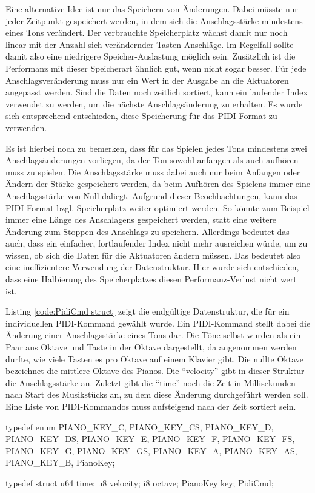 Eine alternative Idee ist nur das Speichern von Änderungen.
Dabei müsste nur jeder Zeitpunkt gespeichert werden, in dem sich die Anschlagsstärke mindestens eines Tons verändert.
Der verbrauchte Speicherplatz wächst damit nur noch linear mit der Anzahl sich verändernder Tasten-Anschläge.
Im Regelfall sollte damit also eine niedrigere Speicher-Auslastung möglich sein.
Zusätzlich ist die Performanz mit dieser Speicherart ähnlich gut, wenn nicht sogar besser.
Für jede Anschlagsveränderung muss nur ein Wert in der Ausgabe an die Aktuatoren angepasst werden.
Sind die Daten noch zeitlich sortiert, kann ein laufender Index verwendet zu werden, um die nächste Anschlagsänderung zu erhalten.
Es wurde sich entsprechend entschieden, diese Speicherung für das \ac{PIDI}-Format zu verwenden.

Es ist hierbei noch zu bemerken, dass für das Spielen jedes Tons mindestens zwei Anschlagsänderungen vorliegen, da der Ton sowohl anfangen als auch aufhören muss zu spielen.
Die Anschlagsstärke muss dabei auch nur beim Anfangen oder Ändern der Stärke gespeichert werden, da beim Aufhören des Spielens immer eine Anschlagsstärke von Null daliegt.
Aufgrund dieser Beochbachtungen, kann das \ac{PIDI}-Format bzgl. Speicherplatz weiter optimiert werden.
So könnte zum Beispiel immer eine Länge des Anschlagens gespeichert werden, statt eine weitere Änderung zum Stoppen des Anschlags zu speichern.
Allerdings bedeutet das auch, dass ein einfacher, fortlaufender Index nicht mehr ausreichen würde, um zu wissen, ob sich die Daten für die Aktuatoren ändern müssen.
Das bedeutet also eine ineffizientere Verwendung der Datenstruktur.
Hier wurde sich entschieden, dass eine Halbierung des Speicherplatzes diesen Performanz-Verlust nicht wert ist.

Listing \ref{code:PidiCmd struct} zeigt die endgültige Datenstruktur, die für ein individuellen \ac{PIDI}-Kommand gewählt wurde.
Ein \ac{PIDI}-Kommand stellt dabei die Änderung einer Anschlagsstärke eines Tons dar.
Die Töne selbst wurden als ein Paar aus Oktave und Taste in der Oktave dargestellt, da angenommen werden durfte, wie viele Tasten es pro Oktave auf einem Klavier gibt.
Die nullte Oktave bezeichnet die mittlere Oktave des Pianos.
Die \enquote{velocity} gibt in dieser Struktur die Anschlagsstärke an.
Zuletzt gibt die \enquote{time} noch die Zeit in Millisekunden nach Start des Musikstücks an, zu dem diese Änderung durchgeführt werden soll.
Eine Liste von \ac{PIDI}-Kommandos muss aufsteigend nach der Zeit sortiert sein.

\begin{UnbrokenCodePage}[style=CStyle, caption={Definition eines \ac{PIDI}-Kommands}, label={code:PidiCmd struct}]
typedef enum {
    PIANO_KEY_C,
    PIANO_KEY_CS,
    PIANO_KEY_D,
    PIANO_KEY_DS,
    PIANO_KEY_E,
    PIANO_KEY_F,
    PIANO_KEY_FS,
    PIANO_KEY_G,
    PIANO_KEY_GS,
    PIANO_KEY_A,
    PIANO_KEY_AS,
    PIANO_KEY_B,
} PianoKey;

typedef struct {
    u64  time;
    u8   velocity;
    i8   octave;
    PianoKey key;
} PidiCmd;
\end{UnbrokenCodePage}

